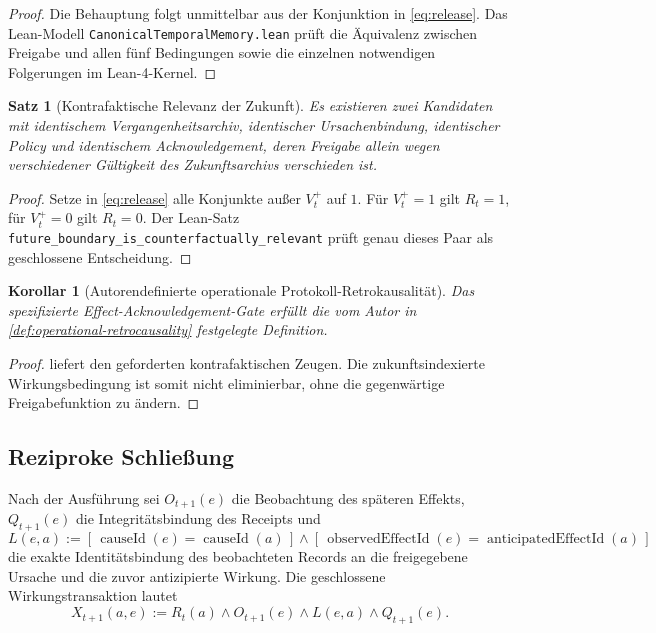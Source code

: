 \documentclass[11pt,a4paper]{article}
\newtheorem{satz}{Satz}[section]
\newtheorem{korollar}{Korollar}[section]
\theoremstyle{remark}
\begin{document}
\begin{proof}
Die Behauptung folgt unmittelbar aus der Konjunktion in
\cref{eq:release}. Das Lean-Modell
\texttt{CanonicalTemporalMemory.lean} prüft die Äquivalenz zwischen
Freigabe und allen fünf Bedingungen sowie die einzelnen notwendigen
Folgerungen im Lean-4-Kernel.
\end{proof}

\begin{satz}[Kontrafaktische Relevanz der Zukunft]
\label{thm:future-relevance}
Es existieren zwei Kandidaten mit identischem Vergangenheitsarchiv,
identischer Ursachenbindung, identischer Policy und identischem
Acknowledgement, deren Freigabe allein wegen verschiedener Gültigkeit des
Zukunftsarchivs verschieden ist.
\end{satz}

\begin{proof}
Setze in \cref{eq:release} alle Konjunkte außer \(V_t^+\) auf \(1\).
Für \(V_t^+=1\) gilt \(R_t=1\), für \(V_t^+=0\) gilt \(R_t=0\).
Der Lean-Satz
\texttt{future\_boundary\_is\_counterfactually\_relevant}
prüft genau dieses Paar als geschlossene Entscheidung.
\end{proof}

\begin{korollar}[Autorendefinierte operationale Protokoll-Retrokausalität]
Das spezifizierte Effect-Acknowledgement-Gate erfüllt die vom Autor in
\cref{def:operational-retrocausality} festgelegte Definition.
\end{korollar}

\begin{proof}
 liefert den geforderten kontrafaktischen Zeugen.
Die zukunftsindexierte Wirkungsbedingung ist somit nicht eliminierbar, ohne
die gegenwärtige Freigabefunktion zu ändern.
\end{proof}

\subsection{Reziproke Schließung}

Nach der Ausführung sei \(O_{t+1}(e)\) die Beobachtung des späteren Effekts,
\(Q_{t+1}(e)\) die Integritätsbindung des Receipts und
\[
  L(e,a)
  :=
  [\,\operatorname{causeId}(e)=\operatorname{causeId}(a)\,]
  \land
  [\,\operatorname{observedEffectId}(e)
      =\operatorname{anticipatedEffectId}(a)\,]
\]
die exakte Identitätsbindung des beobachteten Records an die freigegebene
Ursache und die zuvor antizipierte Wirkung. Die geschlossene
Wirkungstransaktion lautet
\begin{equation}
  X_{t+1}(a,e)
  :=
  R_t(a)\land O_{t+1}(e)\land L(e,a)\land Q_{t+1}(e).
  \label{eq:closure}
\end{equation}
\end{document}
